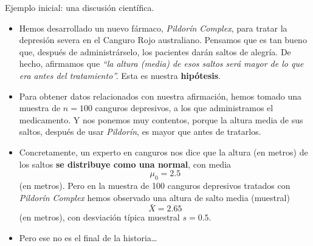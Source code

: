 \documentclass[
  9pt,
  ignorenonframetext,
]{beamer}
\begin{document}
\begin{frame}{Ejemplo inicial: una discusión científica.}
\protect\hypertarget{ejemplo-inicial-una-discusion-cientifica.}{}

\begin{itemize}
\item
  Hemos desarrollado un nuevo fármaco, \emph{Pildorín Complex}, para
  tratar la depresión severa en el Canguro Rojo australiano. Pensamos
  que es tan bueno que, después de administrárselo, los pacientes darán
  saltos de alegría. De hecho, afirmamos que \emph{``la altura (media)
  de esos saltos será mayor de lo que era antes del tratamiento''.} Esta
  es nuestra \textbf{hipótesis}.
\item
  Para obtener datos relacionados con nuestra afirmación, hemos tomado
  una muestra de \(n = 100\) canguros depresivos, a los que
  administramos el medicamento. Y nos ponemos muy contentos, porque la
  altura media de sus saltos, después de usar \emph{Pildorín}, es mayor
  que antes de tratarlos.
\item
  Concretamente, un experto en canguros nos dice que la altura (en
  metros) de los saltos \textbf{se distribuye como una normal}, con
  media \[\mu_0 = 2.5\] (en metros). Pero en la muestra de 100 canguros
  depresivos tratados con \emph{Pildorín Complex} hemos observado una
  altura de salto media (muestral) \[\bar X =  2.65\] (en metros), con
  desviación típica muestral \(s = 0.5\).
\item
  Pero ese no es el final de la historia\ldots{}
\end{itemize}

\vspace{2mm}

\end{frame}
\end{document}
